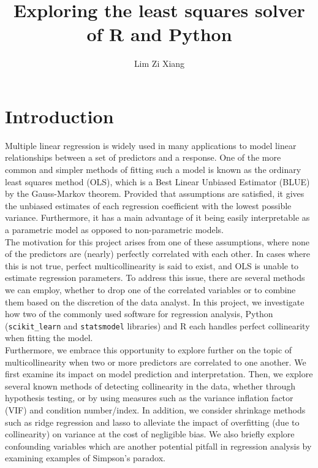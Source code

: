 \documentclass[12pt]{article}
\title{Exploring the least squares solver of R and Python}
\author{Lim Zi Xiang}
\date{}
\begin{document}
	\tableofcontents
	\pagebreak
	
	\section{Introduction}
	
	Multiple linear regression is widely used in many applications to model linear relationships between a set of predictors and a response. One of the more common and simpler methods of fitting such a model is known as the ordinary least squares method (OLS), which is a Best Linear Unbiased Estimator (BLUE) by the Gauss-Markov theorem. Provided that assumptions are satisfied, it gives the unbiased estimates of each regression coefficient with the lowest possible variance. Furthermore, it has a main advantage of it being easily interpretable as a parametric model as opposed to non-parametric models.\\
	
	\setlength\parindent{24pt} The motivation for this project arises from one of these assumptions, where none of the predictors are (nearly) perfectly correlated with each other. In cases where this is not true, perfect multicollinearity is said to exist, and OLS is unable to estimate regression parameters. To address this issue, there are several methods we can employ, whether to drop one of the correlated variables or to combine them based on the discretion of the data analyst. In this project, we investigate how two of the commonly used software for regression analysis, Python (\texttt{scikit\_learn} and \texttt{statsmodel} libraries) and R each handles perfect collinearity when fitting the model.\\
	
	Furthermore, we embrace this opportunity to explore further on the topic of multicollinearity when two or more predictors are correlated to one another.\cite{McClave2018} We first examine its impact on model prediction and interpretation. Then, we explore several known methods of detecting collinearity in the data, whether through hypothesis testing, or by using measures such as the variance inflation factor (VIF) and condition number/index. In addition, we consider shrinkage methods such as ridge regression and lasso to alleviate the impact of overfitting (due to collinearity) on variance at the cost of negligible bias. We also briefly explore confounding variables which are another potential pitfall in regression analysis by examining examples of Simpson's paradox.\\
	
\end{document}
